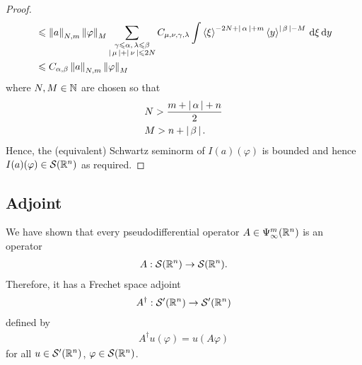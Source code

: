 \documentclass[12pt]{article}
\begin{document}
\begin{proof}
\begin{align*}
    & \leq \norm[a]_{N,m} \norm[\varphi]_M \sum_{\substack{\gamma \leq \alpha, \, \lambda \leq \beta \\ \abs{\mu} + \abs{\nu} \leq 2N}} C_{\mu, \nu, \gamma, \lambda} \int \sym[\xi]^{-2N + \abs{\alpha} + m} \sym[y]^{\abs{\beta} - M} \d[\xi] \d[y] \\
    & \leq C_{\alpha, \beta} \norm[a]_{N,m} \norm[\varphi]_M 
    \end{align*}
    where $N, M \in \N$ are chosen so that 
    \begin{align*}
    &N > \frac{m + \abs{\alpha} + n}{2} \\
    &M > n + \abs{\beta}. 
    \end{align*}
    Hence, the (equivalent) Schwartz seminorm of $I(a)(\varphi)$ is bounded and hence $I(a)(\varphi) \in \sch(\R^n)$ as required. 
 
\end{proof}


\subsection{Adjoint} 

We have shown that every pseudodifferential operator $A \in \Psi^{m}_{\infty}(\R^n)$ is an operator 
\begin{align*}
A: \sch(\R^n) \to \sch(\R^n). 
\end{align*}
Therefore, it has a Frechet space adjoint 
\begin{align*}
A^\dagger : \sch'(\R^n) \to \sch'(\R^n)
\end{align*}
defined by 
\begin{align*}
A^\dagger u(\varphi) = u(A\varphi)
\end{align*}
for all $u \in \sch'(\R^n)$, $\varphi \in \sch(\R^n)$. 
\end{document}
